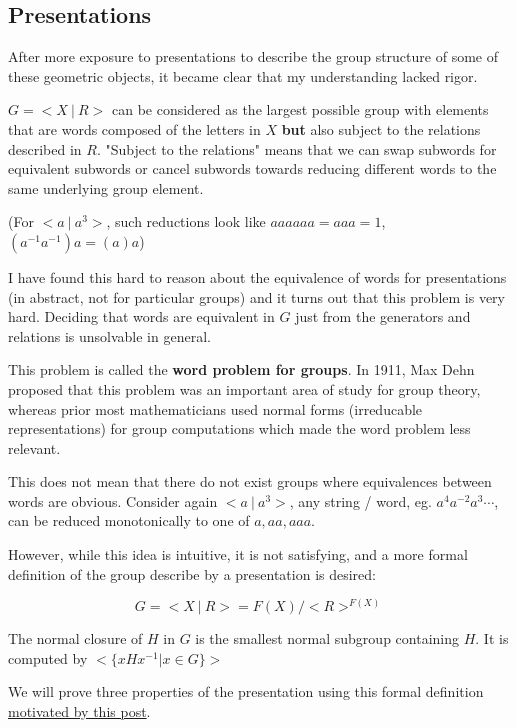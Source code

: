 \documentclass[10pt]{article}
\begin{document}
\subsection{Presentations}

After more exposure to presentations to describe the group structure of some of
these geometric objects, it became clear that my understanding lacked rigor.

$G = <X~|~R>$ can be considered as the largest possible group with elements
that are words composed of the letters in $X$ \textbf{but} also subject to the
relations described in $R$. "Subject to the relations" means that we can swap
subwords for equivalent subwords or cancel subwords towards reducing different
words to the same underlying group element. 

(For $<a ~|~a^3>$, such reductions look like $aaaaaa = aaa = 1$, $(a^{-1}a^{-1})a = (a)a$)

I have found this hard to reason about the equivalence of words for
presentations (in abstract, not for particular groups) and it turns out that
this problem is very hard. Deciding that words are equivalent in $G$ just from
the generators and relations is unsolvable in general.

\begin{note}
	This problem is called the \textbf{word problem for groups}. In 1911, Max
	Dehn proposed that this problem was an important area of study for group
	theory, whereas prior most mathematicians used normal forms (irreducable
	representations) for group computations which made the word problem less
	relevant.
\end{note}

This does not mean that there do not exist groups where equivalences between
words are obvious. Consider again $<a ~|~a^3>$, any string / word, eg.
$a^4a^{-2}a^3\cdots$, can be reduced monotonically to one of $a, aa, aaa$. 

However, while this idea is intuitive, it is not satisfying, and a more formal
definition of the group describe by a presentation is desired:

\[ G = <X~|~R> = F(X) / <R>^{F(X)} \]

\begin{definition}
	The normal closure of $H$ in $G$ is the smallest normal subgroup containing
	$H$. It is computed by $< \{ xHx^{-1} | x \in G \} >$
\end{definition}

We will prove three properties of the presentation using this formal definition
\href{https://math.stackexchange.com/a/695061/1276086}{motivated by this post}.
\end{document}
